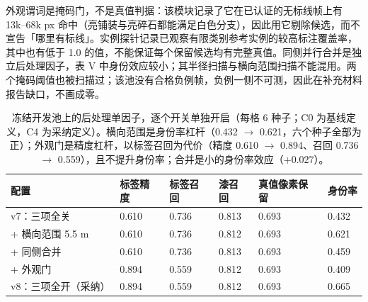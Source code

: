 \documentclass[journal]{IEEEtran}
\begin{document}
外观谓词是掩码门，不是真值判据：该模块记录了它在已认证的无标线帧上有 13k--68k px 命中（亮铺装与亮碎石都能满足白色分支），因此用它剔除候选，而不宣告「哪里有标线」。实例探针记录已观察有限类别参考实例的较高标注覆盖率，其中也有低于 1.0 的值，不能保证每个保留候选均有完整真值。同侧并行合并是独立后处理因子，表 V 中身份效应较小；其半径扫描与横向范围扫描不能混用。两个掩码阈值也被扫描过；该池没有合格负例帧，负例一侧不可测，因此在补充材料报告缺口，不画成零。
\begin{table}[!t]
\centering
\caption{冻结开发池上的后处理单因子，逐个开关单独开启（每格 6 种子；C0 为基线定义，C4 为采纳定义）。横向范围是身份率杠杆（0.432 $\rightarrow$ 0.621，六个种子全部为正）；外观门是精度杠杆，以标签召回为代价（精度 0.610 $\rightarrow$ 0.894、召回 0.736 $\rightarrow$ 0.559），且不提升身份率；合并是小的身份率效应（+0.027）。}
\begin{tabular}{@{}llllll@{}}
\toprule
配置 & 标签精度 & 标签召回 & 漆召回 & 真值像素保留 & 身份率 \\
\midrule
v7：三项全关 & 0.610 & 0.736 & 0.813 & 0.693 & 0.432 \\
+ 横向范围 5.5 m & 0.610 & 0.736 & 0.812 & 0.693 & 0.621 \\
+ 同侧合并 & 0.610 & 0.736 & 0.813 & 0.693 & 0.459 \\
+ 外观门 & 0.894 & 0.559 & 0.812 & 0.693 & 0.409 \\
v8：三项全开（采纳） & 0.894 & 0.559 & 0.812 & 0.693 & 0.665 \\
\bottomrule
\end{tabular}
\end{table}
\end{document}
